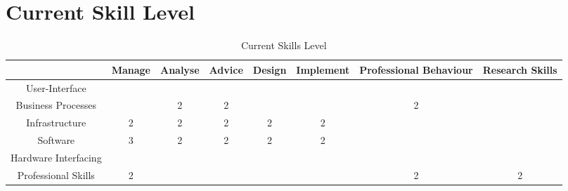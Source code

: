 
\section{Current Skill Level}
\label{sec:current}

\begin{table}[H]
	\centering
	\begin{tabular}{|c|c|c|c|c|c|c|c|}
		\hline
								& Manage 	& Analyse 	& Advice 	& Design 	& Implement 	& Professional Behaviour 	& Research Skills \\ \hline
		User-Interface 			& 			& 			& 			& 			& 	 			& 							& \\ \hline
		Business Processes 		& 			& 2			& 2 		& 			& 				& 2 						& \\ \hline
		Infrastructure 			& 2			& 2 		& 2			& 2 		& 2 			& 							& \\ \hline
		Software 				& 3 		& 2 		& 2 		& 2 		& 2 			& 							& \\ \hline
		Hardware Interfacing 	& 			& 			& 			& 			& 				& 							& \\ \hline
		Professional Skills 	& 2			& 			& 			& 			& 				& 2 						& 2 \\ \hline
	\end{tabular}
	\caption{Current Skills Level}
	\label{currentskills}
\end{table}